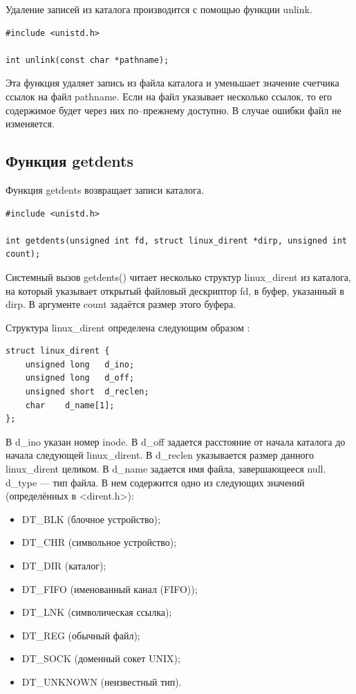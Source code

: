 Удаление записей из каталога производится с помощью функции unlink.

\begin{lstlisting}[label=code:unlink,caption=Функция unlink]
#include <unistd.h>

int unlink(const char *pathname);
\end{lstlisting}

Эта функция удаляет запись из файла каталога и уменьшает значение счетчика ссылок на файл pathname. Если на файл указывает несколько ссылок, то его содержимое будет через них по--прежнему доступно. В случае ошибки файл не изменяется.


\subsection{Функция getdents}

Функция getdents возвращает записи каталога.

\begin{lstlisting}[label=code:getdents,caption=Функция getdents]
#include <unistd.h>
	
int getdents(unsigned int fd, struct linux_dirent *dirp, unsigned int count);
\end{lstlisting}

Системный вызов getdents() читает несколько структур linux\_dirent из каталога, на который указывает открытый файловый дескриптор fd, в буфер, указанный в dirp. В аргументе count задаётся размер этого буфера.

Структура linux\_dirent определена следующим образом \cite{linux}:
\begin{lstlisting}[label=code:linuxdirent,caption=Структура linux\_dirent]
struct linux_dirent {
	unsigned long	d_ino;
	unsigned long	d_off;
	unsigned short	d_reclen;
	char	d_name[1];
};
\end{lstlisting}

В d\_ino указан номер inode. В d\_off задается расстояние от начала каталога до начала следующей linux\_dirent. В d\_reclen указывается размер данного linux\_dirent целиком. В d\_name задается имя файла, завершающееся null.
d\_type --- тип файла.
В нем содержится одно из следующих значений (определённых в <dirent.h>):
\begin{itemize}
	\item DT\_BLK (блочное устройство);
	\item DT\_CHR (символьное устройство);
	\item DT\_DIR (каталог);
	\item DT\_FIFO (именованный канал (FIFO));
	\item DT\_LNK (символическая ссылка);
	\item DT\_REG (обычный файл);
	\item DT\_SOCK (доменный сокет UNIX);
	\item DT\_UNKNOWN (неизвестный тип).
\end{itemize}


